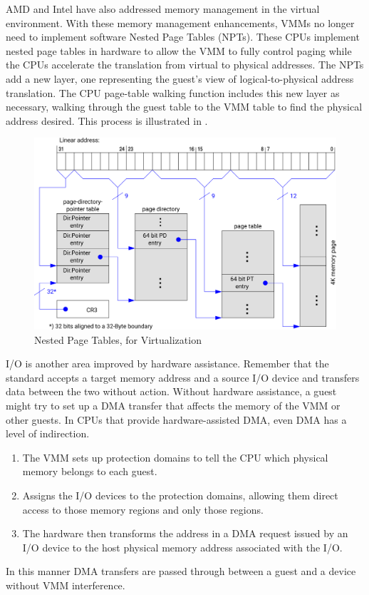 AMD and Intel have also addressed memory management in the virtual environment.
With these memory management enhancements, VMMs no longer need to implement software Nested Page Tables (NPTs).
These CPUs implement nested page tables in hardware to allow the VMM to fully control paging while the CPUs accelerate the translation from virtual to physical addresses.
The NPTs add a new layer, one representing the guest's view of logical-to-physical address translation.
The CPU page-table walking function includes this new layer as necessary, walking through the guest table to the VMM table to find the physical address desired.
This process is illustrated in .

\begin{figure}[h!tbp]
  \centering
  \includegraphics[scale=1.00]{./Drawings/EDAF35-Operating_Systems/Nested_Page_Tables-Virtualization.png}
  \caption{Nested Page Tables, for Virtualization}
  \label{fig:Nested_Page_Tables}
\end{figure}

I/O is another area improved by hardware assistance.
Remember that the standard  accepts a target memory address and a source I/O device and transfers data between the two without  action.
Without hardware assistance, a guest might try to set up a DMA transfer that affects the memory of the VMM or other guests.
In CPUs that provide hardware-assisted DMA, even DMA has a level of indirection.
\begin{enumerate}[noitemsep]
\item The VMM sets up protection domains to tell the CPU which physical memory belongs to each guest.
\item Assigns the I/O devices to the protection domains, allowing them direct access to those memory regions and only those regions.
\item The hardware then transforms the address in a DMA request issued by an I/O device to the host physical memory address associated with the I/O.
\end{enumerate}

In this manner DMA transfers are passed through between a guest and a device without VMM interference.


